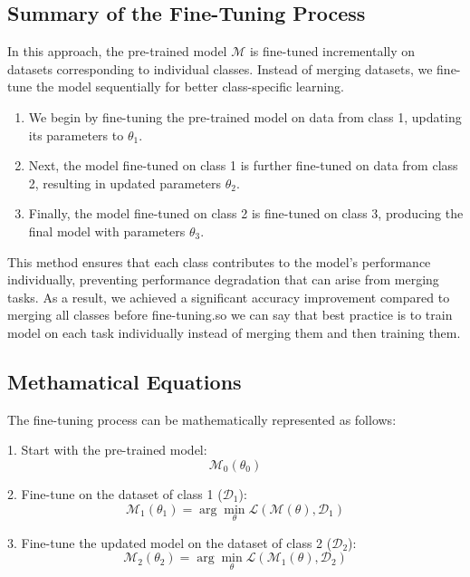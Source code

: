 \documentclass[conference]{IEEEtran}
\begin{document}
\subsection*{Summary of the Fine-Tuning Process}
In this approach, the pre-trained model \( \mathcal{M} \) is fine-tuned incrementally on datasets corresponding to individual classes. Instead of merging datasets, we fine-tune the model sequentially for better class-specific learning.

\begin{enumerate}
    \item We begin by fine-tuning the pre-trained model on data from class 1, updating its parameters to \( \theta_1 \).
    \item Next, the model fine-tuned on class 1 is further fine-tuned on data from class 2, resulting in updated parameters \( \theta_2 \).
    \item Finally, the model fine-tuned on class 2 is fine-tuned on class 3, producing the final model with parameters \( \theta_3 \).
\end{enumerate}

This method ensures that each class contributes to the model's performance individually, preventing performance degradation that can arise from merging tasks. As a result, we achieved a significant accuracy improvement compared to merging all classes before fine-tuning.so we can say that best practice is to train model on each task individually instead of merging them and then training them.

\subsection{Methamatical Equations}
The fine-tuning process can be mathematically represented as follows:

1. Start with the pre-trained model:
\begin{equation}
\mathcal{M}_0(\theta_0)
\end{equation}

2. Fine-tune on the dataset of class 1 (\( \mathcal{D}_1 \)):
\begin{equation}
\mathcal{M}_1(\theta_1) = \arg \min_{\theta} \mathcal{L}(\mathcal{M}(\theta), \mathcal{D}_1)
\end{equation}

3. Fine-tune the updated model on the dataset of class 2 (\( \mathcal{D}_2 \)):
\begin{equation}
\mathcal{M}_2(\theta_2) = \arg \min_{\theta} \mathcal{L}(\mathcal{M}_1(\theta), \mathcal{D}_2)
\end{equation}
\end{document}
